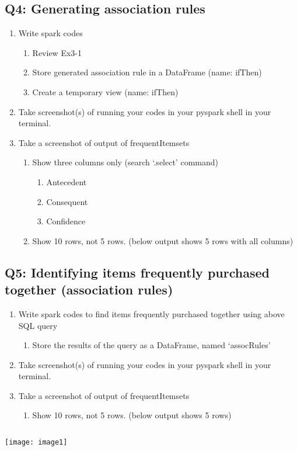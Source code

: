 \documentclass[]{article}
\begin{document}
\subsection*{Q4: Generating association rules}
\begin{enumerate}[before=\itshape,label=\arabic*.]
	\item Write spark codes
	\begin{enumerate}[before=\itshape,label=\alph*.]
		\item Review Ex3-1
		\item Store generated association rule in a DataFrame (name: ifThen)
		\item Create a temporary view (name: ifThen)
	\end{enumerate}
	\item Take screenshot(s) of running your codes in your pyspark shell in your terminal.
	\item Take a screenshot of output of frequentItemsets
	\begin{enumerate}[before=\itshape,label=\alph*.]
		\item Show three columns only (search ‘.select’ command)
		\begin{enumerate}[before=\itshape,label=\roman*.]
			\item Antecedent
			\item Consequent
			\item Confidence
		\end{enumerate}
		\item Show 10 rows, not 5 rows. (below output shows 5 rows with all columns)
	\end{enumerate}
\end{enumerate} 


\subsection*{Q5: Identifying items frequently purchased together (association rules)}

\begin{enumerate}[before=\itshape,label=\arabic*.]
	\item Write spark codes to find items frequently purchased together using above SQL query
	\begin{enumerate}[before=\itshape,label=\alph*.]
		\item Store the results of the query as a DataFrame, named ‘assocRules’
	\end{enumerate}
	\item Take screenshot(s) of running your codes in your pyspark shell in your terminal.
	\item Take a screenshot of output of frequentItemsets
	\begin{enumerate}[before=\itshape,label=\alph*.]
		\item Show 10 rows, not 5 rows. (below output shows 5 rows)
	\end{enumerate}
\end{enumerate} 


\begin{verbatim}

\end{verbatim}

\texttt{[image: image1]}
\end{document}
